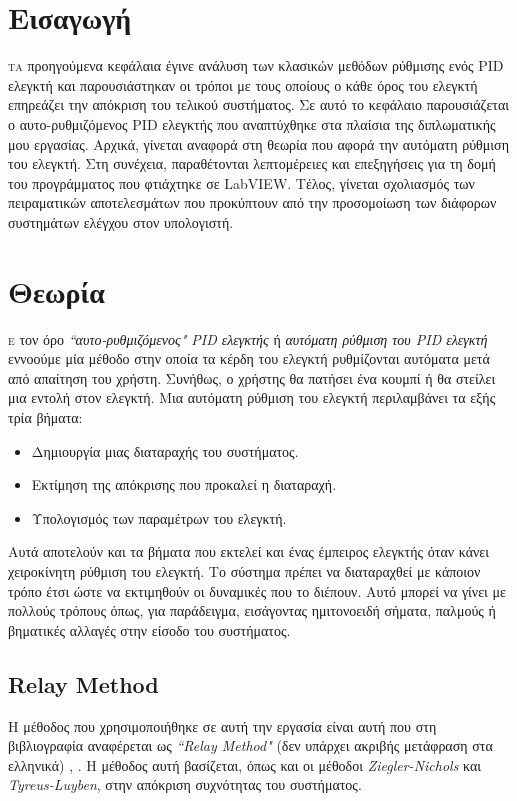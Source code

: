 


\section{Εισαγωγή}

\lettrine[findent=2pt]{}{τα} προηγούμενα κεφάλαια έγινε ανάλυση των κλασικών μεθόδων ρύθμισης ενός PID ελεγκτή και παρουσιάστηκαν οι τρόποι με τους οποίους ο κάθε όρος του ελεγκτή επηρεάζει την απόκριση του τελικού συστήματος. Σε αυτό το κεφάλαιο παρουσιάζεται ο αυτο-ρυθμιζόμενος PID ελεγκτής που αναπτύχθηκε στα πλαίσια της διπλωματικής μου εργασίας. Αρχικά, γίνεται αναφορά στη θεωρία που αφορά την αυτόματη ρύθμιση του ελεγκτή. Στη συνέχεια, παραθέτονται λεπτομέρειες και επεξηγήσεις για τη δομή του προγράμματος που φτιάχτηκε σε LabVIEW.  Τέλος, γίνεται σχολιασμός των πειραματικών αποτελεσμάτων που προκύπτουν από την προσομοίωση των διάφορων συστημάτων ελέγχου στον υπολογιστή.

\section{Θεωρία}

\lettrine[findent=2pt]{}{ε} τον όρο \emph{``αυτο-ρυθμιζόμενος" PID ελεγκτής} ή \emph{αυτόματη ρύθμιση του PID ελεγκτή} εννοούμε μία μέθοδο στην οποία τα κέρδη του ελεγκτή ρυθμίζονται αυτόματα μετά από απαίτηση του χρήστη. Συνήθως, ο χρήστης θα πατήσει ένα κουμπί ή θα στείλει μια εντολή στον ελεγκτή. Μια αυτόματη ρύθμιση του ελεγκτή περιλαμβάνει τα εξής τρία βήματα:

\begin{itemize}
	\item Δημιουργία μιας διαταραχής του συστήματος.
	\item Εκτίμηση της απόκρισης που προκαλεί η διαταραχή.
	\item Υπολογισμός των παραμέτρων του ελεγκτή.
\end{itemize}
Αυτά αποτελούν και τα βήματα που εκτελεί και ένας έμπειρος ελεγκτής όταν κάνει χειροκίνητη ρύθμιση του ελεγκτή. Το σύστημα πρέπει να διαταραχθεί με κάποιον τρόπο έτσι ώστε να εκτιμηθούν οι δυναμικές που το διέπουν. Αυτό μπορεί να γίνει με πολλούς τρόπους όπως, για παράδειγμα, εισάγοντας ημιτονοειδή σήματα, παλμούς ή βηματικές αλλαγές στην είσοδο του συστήματος.

\subsection{Relay Method}
Η μέθοδος που χρησιμοποιήθηκε σε αυτή την εργασία είναι αυτή που στη βιβλιογραφία αναφέρεται ως \emph{``Relay Method"} (δεν υπάρχει ακριβής μετάφραση στα ελληνικά) \cite{astrom}, \cite{vandoren}. Η μέθοδος αυτή βασίζεται, όπως και οι μέθοδοι \emph{Ziegler-Nichols} και \emph{Tyreus-Luyben}, στην απόκριση συχνότητας του συστήματος.

